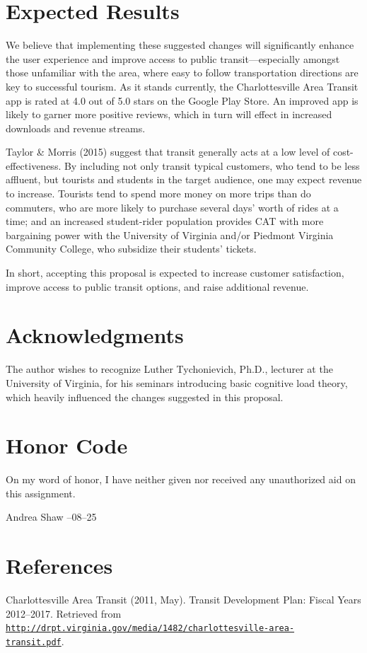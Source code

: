 \documentclass[12pt,letterpaper]{article}
\begin{document}
\section{Expected Results}
We believe that implementing these suggested changes will significantly enhance
the user experience and improve access to public transit---especially amongst
those unfamiliar with the area, where easy to follow transportation directions
are key to successful tourism. As it stands currently, the Charlottesville Area
Transit app is rated at 4.0 out of 5.0 stars on the Google Play Store. An improved
app is likely to garner more positive reviews, which in turn will effect in
increased downloads and revenue streams.

Taylor \& Morris (2015) suggest that transit generally acts at a low level of
cost-effectiveness. By including not only transit typical customers, who tend
to be less affluent, but tourists and students in the target audience, one may
expect revenue to increase. Tourists tend to spend more money on more trips
than do commuters, who are more likely to purchase several days' worth of rides
at a time; and an increased student-rider population provides CAT with more
bargaining power with the University of Virginia and/or Piedmont Virginia
Community College, who subsidize their students' tickets.

In short, accepting this proposal is expected to increase customer satisfaction,
improve access to public transit options, and raise additional revenue.

\section{Acknowledgments}
The author wishes to recognize Luther Tychonievich, Ph.D., lecturer at the
University of Virginia, for his seminars introducing basic
cognitive load theory, which heavily influenced the changes suggested in this
proposal.

\section{Honor Code}
On my word of honor, I have neither given nor received any unauthorized aid on this assignment.
\begin{center}
    Andrea Shaw\qquad {\hrulefill} --08--25
\end{center}

\section{References}
Charlottesville Area Transit (2011, May). Transit Development Plan: Fiscal Years 2012--2017. Retrieved from \href{http://drpt.virginia.gov/media/1482/charlottesville-area-transit.pdf}{\tt http://drpt.virginia.gov/media/1482/charlottesville-area- \\
transit.pdf}.
\end{document}
